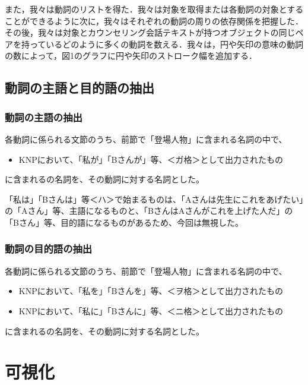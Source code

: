 \documentclass[shuuron]{kuee}
\begin{document}
また，我々は動詞のリストを得た．我々は対象を取得または各動詞の対象とすることができるように次に，我々はそれぞれの動詞の周りの依存関係を把握した．
その後，我々は対象とカウンセリング会話テキストが持つオブジェクトの同じペアを持っているどのように多くの動詞を数える．我々は，円や矢印の意味の動詞の数によって，図1のグラフに円や矢印のストローク幅を追加する．

\subsection{動詞の主語と目的語の抽出}

\subsubsection{動詞の主語の抽出}


各動詞に係られる文節のうち、前節で「登場人物」に含まれる名詞の中で、

\begin{itemize}

  \item KNPにおいて、「私が」「Bさんが」等、＜ガ格＞として出力されたもの
\end{itemize}
に含まれるの名詞を、その動詞に対する名詞とした。

「私は」「Bさんは」等＜ハ＞で始まるものは、「Aさんは先生にこれをあげたい」の「Aさん」等、主語になるものと、「BさんはAさんがこれを上げた人だ」の「Bさん」等、目的語になるものがあるため、今回は無視した。

\subsubsection{動詞の目的語の抽出}


各動詞に係られる文節のうち、前節で「登場人物」に含まれる名詞の中で、

\begin{itemize}

  \item KNPにおいて、「私を」「Bさんを」等、＜ヲ格＞として出力されたもの
  \item KNPにおいて、「私に」「Bさんに」等、＜ニ格＞として出力されたもの
\end{itemize}
に含まれるの名詞を、その動詞に対する名詞とした。


\section{可視化}
\end{document}
